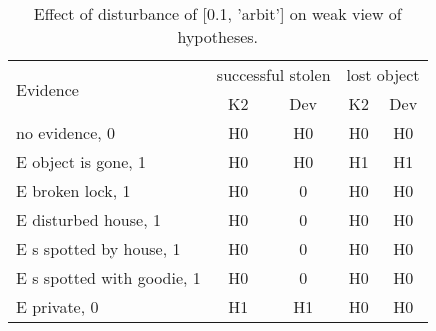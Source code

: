 \begin{table}\begin{tabular}{l|cc|cc}\toprule\multirow{2}{*}{Evidence} & \multicolumn{2}{c}{successful stolen}& \multicolumn{2}{c}{lost object}\\& {K2} & {Dev}& {K2} & {Dev}\\\midrule
no evidence, 0 & H0&H0&H0&H0\\E object is gone, 1 & H0&H0&H1&H1\\E broken lock, 1 & \cellcolor{Bittersweet}H0&\cellcolor{Bittersweet}0&H0&H0\\E disturbed house, 1 & \cellcolor{Bittersweet}H0&\cellcolor{Bittersweet}0&H0&H0\\E s spotted by house, 1 & \cellcolor{Bittersweet}H0&\cellcolor{Bittersweet}0&H0&H0\\E s spotted with goodie, 1 & \cellcolor{Bittersweet}H0&\cellcolor{Bittersweet}0&H0&H0\\E private, 0 & H1&H1&H0&H0\\\bottomrule\end{tabular}\caption{Effect of disturbance of [0.1, 'arbit'] on weak view of hypotheses.}\end{table}